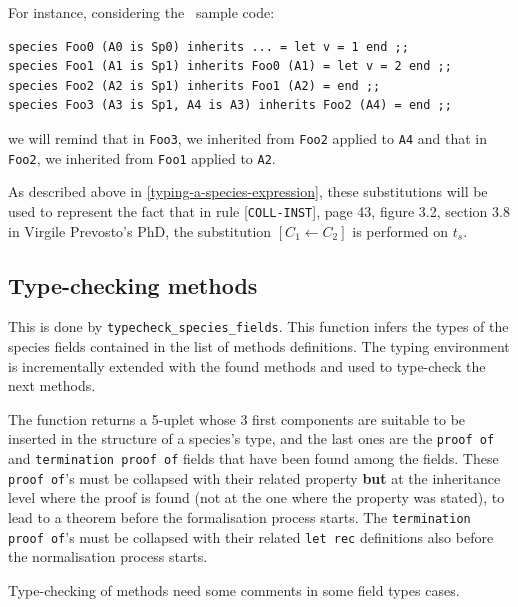 For instance, considering the \focalize\ sample code:
{\footnotesize
\begin{lstlisting}
species Foo0 (A0 is Sp0) inherits ... = let v = 1 end ;;
species Foo1 (A1 is Sp1) inherits Foo0 (A1) = let v = 2 end ;;
species Foo2 (A2 is Sp1) inherits Foo1 (A2) = end ;;
species Foo3 (A3 is Sp1, A4 is A3) inherits Foo2 (A4) = end ;;
\end{lstlisting}
}

\noindent we will remind that in {\tt Foo3}, we inherited from
{\tt Foo2} applied to {\tt A4} and that in {\tt Foo2}, we inherited
from {\tt Foo1} applied to {\tt A2}.

As described above in \ref{typing-a-species-expression}, these
substitutions will be used to represent the fact that in rule
[{\tt COLL-INST}], page 43, figure 3.2, section 3.8 in Virgile
Prevosto's PhD, the substitution $[C_1 \leftarrow C_2]$ is performed
on $t_s$.



\subsection{Type-checking methods}
This is done by {\tt typecheck\_species\_fields}. This function infers
the types of the species fields contained in the list of methods
definitions. The typing environment is incrementally extended with the
found methods and used to type-check the next methods.

The function returns a 5-uplet whose 3 first components are suitable to
be inserted in the structure of a species's type, and the last ones are
the {\tt proof of} and {\tt termination proof of} fields that have
been found among the fields. These {\tt proof of}'s must be collapsed
with their related property {\bf but} at the inheritance level where
the proof is found (not at the one where the property was stated),
to lead to a theorem before the formalisation process starts.
The {\tt termination proof of}'s must be collapsed with their related
{\tt let rec} definitions also before the normalisation process
starts.

Type-checking of methods need some comments in some field types
cases.

